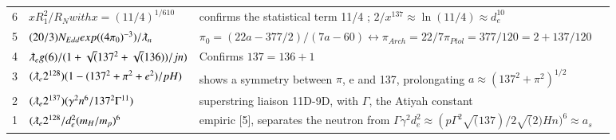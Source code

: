 \documentclass[a4paper,9pt]{article}
\begin{document}
\begin{appendix}
\begin{table}
\begin{tabular}{llll}
    6 & $xR_1^2/R_N with x = (11/4)^{1/610}$ &  confirms the statistical term 11/4 ; $2/x^{137} \approx \ln(11/4) \approx d_e^{10}$ \\
    
    5 & $(20/3)N_{Edd} exp((4 \pi_0)^{-3})/\lambdabar_n$ & $\pi_0 =  (22a - 377/2)/(7a - 60) \leftrightarrow \pi_{Arch} = 22/7  \pi_{Ptol} = 377/120 = 2 + 137/120$  \\
    
     4 & $\lambdabar_{e} g(6)/(1+\sqrt(137^2+\sqrt(136))/jn)$  & Confirms $137=136+1$ \\
    3 & $(\lambdabar_{e} 2^{128})(1-(137^2+\pi^2+e^2)/pH)$ & shows a symmetry between $\pi$, e and 137, prolongating $ a \approx (137^2 + \pi^2)^{1/2}$ \\
     2 & $(\lambdabar_{e} 2^{137})(\gamma^2 n^6 / 137^2 \Gamma^{11})$ & superstring liaison 11D-9D, with $\Gamma$, the Atiyah constant \\
    1 & $(\lambdabar_{e} 2^{128}/d_e^2(m_H/m_p)^6$  & empiric [5], separates the neutron from $\Gamma \gamma^2 d_e^2 \approx (p\Gamma^2 \sqrt(137)/2 \sqrt(2) Hn)^6 \approx a_s$ \\
    
    \bottomrule
  \end{tabular}
\end{table}


% 




\end{appendix}
\end{document}
